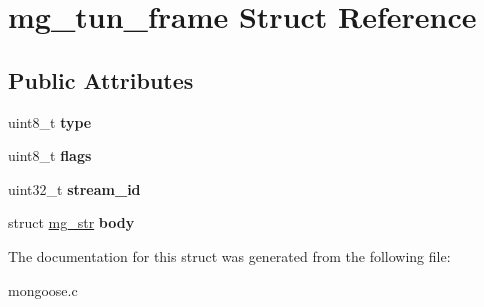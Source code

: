\hypertarget{structmg__tun__frame}{}\section{mg\+\_\+tun\+\_\+frame Struct Reference}
\label{structmg__tun__frame}
\subsection*{Public Attributes}
\begin{DoxyCompactItemize}
\item 
\mbox{\label{structmg__tun__frame_a7b0c01ce546ee5b25b7910958e0acde1}} 
uint8\+\_\+t {\bfseries type}
\item 
\mbox{\label{structmg__tun__frame_a17f3753158bd1dc19cd47658dcd8a647}} 
uint8\+\_\+t {\bfseries flags}
\item 
\mbox{\label{structmg__tun__frame_a01db02c8e303dd90887b38efb8444b2b}} 
uint32\+\_\+t {\bfseries stream\+\_\+id}
\item 
\mbox{\label{structmg__tun__frame_adcc6a8085ba62eaa3d5b646a183d1418}} 
struct \hyperlink{structmg__str}{mg\+\_\+str} {\bfseries body}
\end{DoxyCompactItemize}


The documentation for this struct was generated from the following file\+:\begin{DoxyCompactItemize}
\item 
mongoose.\+c\end{DoxyCompactItemize}
